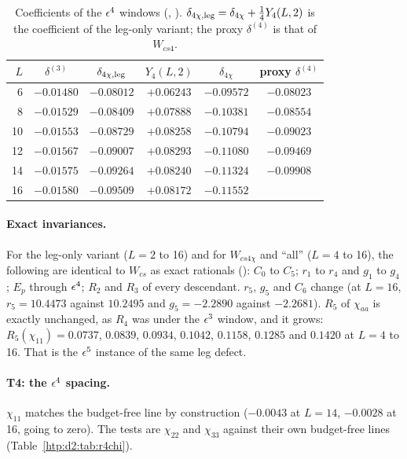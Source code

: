 \begin{table}[ht]
\centering\footnotesize\renewcommand{\arraystretch}{1.15}
\begin{tabular}{@{}rccccc@{}}
\toprule
$L$ & $\delta^{(3)}$ & $\delta_{4\chi,{\rm leg}}$ & $Y_4(L,2)$ & $\delta_{4\chi}$ & proxy $\delta^{(4)}$ \\\midrule
6 & $-0.01480$ & $-0.08012$ & $+0.06243$ & $-0.09572$ & $-0.08023$ \\
8 & $-0.01529$ & $-0.08409$ & $+0.07888$ & $-0.10381$ & $-0.08554$ \\
10 & $-0.01553$ & $-0.08729$ & $+0.08258$ & $-0.10794$ & $-0.09023$ \\
12 & $-0.01567$ & $-0.09007$ & $+0.08293$ & $-0.11080$ & $-0.09469$ \\
14 & $-0.01575$ & $-0.09264$ & $+0.08240$ & $-0.11324$ & $-0.09908$ \\
16 & $-0.01580$ & $-0.09509$ & $+0.08172$ & $-0.11552$ & \\
\bottomrule
\end{tabular}
\caption{Coefficients of the $\epsilon^4$ windows (, ).
$\delta_{4\chi,{\rm leg}}=\delta_{4\chi}+\frac14Y_4(L,2)$ is the coefficient of the leg-only variant; the proxy $\delta^{(4)}$ is that of
$W_{cs4}$.}
\label{htp:d2:tab:d4chi}
\end{table}

\paragraph{Exact invariances.} For the leg-only variant ($L=2$ to 16) and for $W_{cs4\chi}$ and ``all'' ($L=4$ to 16), the following are
identical to $W_{cs}$ as exact rationals (): $C_0$ to $C_5$; $r_1$ to $r_4$ and $g_1$ to $g_4$; $E_p$
through $\epsilon^4$; $R_2$ and $R_3$ of every descendant. $r_5$, $g_5$ and $C_6$ change (at $L=16$, $r_5=10.4473$ against
$10.2495$ and $g_5=-2.2890$ against $-2.2681$). $R_5$ of $\chi_{aa}$ is exactly unchanged, as $R_4$ was under the $\epsilon^3$
window, and it grows: $R_5(\chi_{11})=0.0737$, $0.0839$, $0.0934$, $0.1042$, $0.1158$, $0.1285$ and $0.1420$ at $L=4$ to 16.
That is the $\epsilon^5$ instance of the same leg defect.

\paragraph{T4: the $\epsilon^4$ spacing.} $\chi_{11}$ matches the budget-free line by construction ($-0.0043$ at $L=14$, $-0.0028$ at
16, going to zero). The tests are $\chi_{22}$ and $\chi_{33}$ against their own budget-free lines (Table~\ref{htp:d2:tab:r4chi}).

